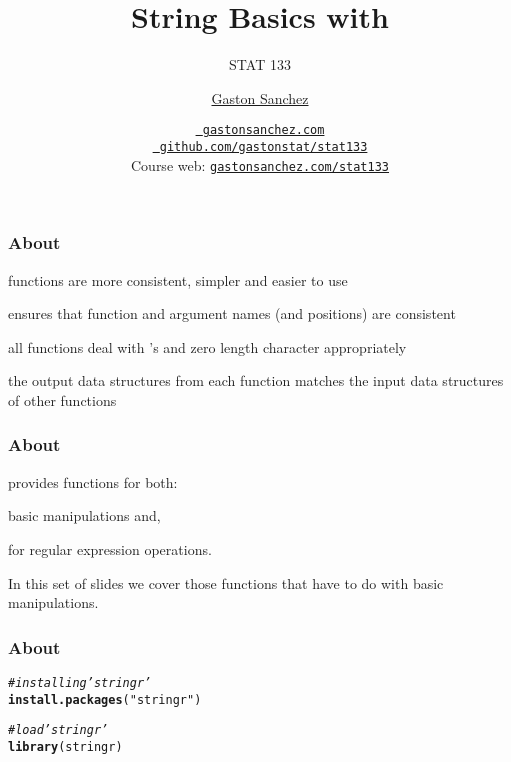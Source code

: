 \documentclass[12pt]{beamer}\usepackage[]{graphicx}\usepackage[]{color}
\title{String Basics with \code{"stringr"}}
\subtitle{STAT 133}
\author{\href{http://www.gastonsanchez.com}{Gaston Sanchez}}
\institute{Department of Statistics, UC{\textendash}Berkeley}
\date{\href{http://www.gastonsanchez.com}{\tt \scriptsize \color{foreground} gastonsanchez.com}
\\[-4pt]
\href{http://github.com/gastonstat/stat133}{\tt \scriptsize \color{foreground} github.com/gastonstat/stat133}
\\[-4pt]
{\scriptsize Course web: \href{http://www.gastonsanchez.com/stat133}{\tt gastonsanchez.com/stat133}}
}
\makeatletter
\newcommand{\hlstr}[1]{\textcolor[rgb]{0.192,0.494,0.8}{#1}}%
\newcommand{\hlcom}[1]{\textcolor[rgb]{0.678,0.584,0.686}{\textit{#1}}}%
\newcommand{\hlstd}[1]{\textcolor[rgb]{0.345,0.345,0.345}{#1}}%
\newcommand{\hlkwd}[1]{\textcolor[rgb]{0.737,0.353,0.396}{\textbf{#1}}}%
\newenvironment{kframe}{%
 \def\at@end@of@kframe{}%
 \ifinner\ifhmode%
  \def\at@end@of@kframe{\end{minipage}}%
  \begin{minipage}{\columnwidth}%
 \fi\fi%
 \def\FrameCommand##1{\hskip\@totalleftmargin \hskip-\fboxsep
 \colorbox{shadecolor}{##1}\hskip-\fboxsep
     \hskip-\linewidth \hskip-\@totalleftmargin \hskip\columnwidth}%
 \MakeFramed {\advance\hsize-\width
   \@totalleftmargin\z@ \linewidth\hsize
   \@setminipage}}%
 {\par\unskip\endMakeFramed%
 \at@end@of@kframe}
\newenvironment{knitrout}{}{} %
\makeatother
\begin{document}
{
  \frame{
    \titlepage
  } 
}


\begin{frame}
\begin{center}
\Huge{}
\end{center}
\end{frame}


\begin{frame}
\frametitle{About }

\bi
  \item functions are more consistent, simpler and easier to use 
  \item {} ensures that function and argument names (and positions) are consistent
  \item all functions deal with 's and zero length character appropriately
  \item the output data structures from each function matches the input data structures of other functions
\ei
\eb

\end{frame}


\begin{frame}
\frametitle{About }

 provides functions for both:
\bi
  \item basic manipulations and,
  \item for regular expression operations. 
\ei

In this set of slides we cover those functions that have to do with basic manipulations.

\end{frame}


\begin{frame}[fragile]
\frametitle{About }

\begin{knitrout}\footnotesize
{}\color{fgcolor}\begin{kframe}
\begin{alltt}
\hlcom{# installing 'stringr'}
\hlkwd{install.packages}\hlstd{(}\hlstr{"stringr"}\hlstd{)}

\hlcom{# load 'stringr'}
\hlkwd{library}\hlstd{(stringr)}
\end{alltt}
\end{kframe}
\end{knitrout}



\end{frame}
\end{document}
